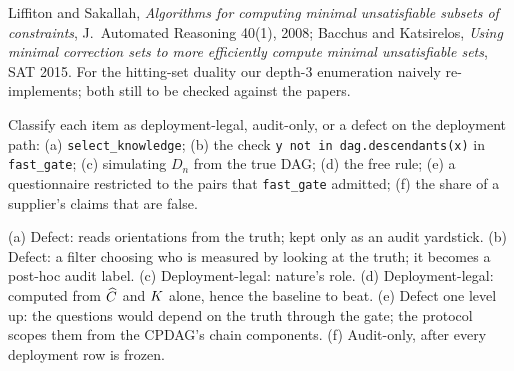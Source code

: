 \begin{fonte}
Liffiton and Sakallah, \emph{Algorithms for computing minimal unsatisfiable subsets of constraints}, J.\ Automated Reasoning 40(1),
2008; Bacchus and Katsirelos, \emph{Using minimal correction sets to more efficiently compute minimal unsatisfiable sets}, SAT 2015.
For the hitting-set duality our depth-3 enumeration naively re-implements; both still to be checked against the papers.
\end{fonte}



\begin{exercicio}[metodo=classification,conceito=invariante]
Classify each item as deployment-legal, audit-only, or a defect on the deployment path: (a) \texttt{select\_knowledge}; (b) the check
\texttt{y not in dag.descendants(x)} in \texttt{fast\_gate}; (c) simulating $D_n$ from the true DAG; (d) the free rule; (e) a
questionnaire restricted to the pairs that \texttt{fast\_gate} admitted; (f) the share of a supplier's claims that are false.
\end{exercicio}
\begin{solucao}
(a) Defect: reads orientations from the truth; kept only as an audit yardstick. (b) Defect: a filter choosing who is measured by
looking at the truth; it becomes a post-hoc audit label. (c) Deployment-legal: nature's role. (d) Deployment-legal: computed from $\widehat{C}$
and $K$ alone, hence the baseline to beat. (e) Defect one level up: the questions would depend on the truth through the gate; the
protocol scopes them from the CPDAG's chain components. (f) Audit-only, after every deployment row is frozen.
\end{solucao}

